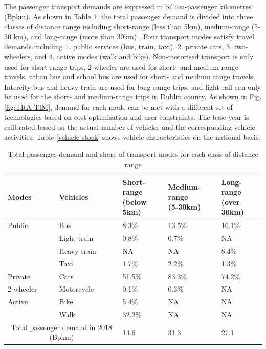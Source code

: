 \documentclass[gmd,manuscript]{copernicus}
\begin{document}
The passenger transport demands are expressed in billion-passenger kilometres (Bpkm). As shown in Table \ref{passenger transport demand}, the total passenger demand is divided into three classes of distance range including short-range (less than 5km), medium-range (5-30 km), and long-range (more than 30km) \citep{NTA2018}. Four transport modes satisfy travel demands including 1. public services (bus, train, taxi), 2. private cars, 3. two-wheelers, and 4. active modes (walk and bike). Non-motorised transport is only used for short-range trips, 2-wheeler are used for short- and medium-range travels, urban bus and school bus are used for short- and medium range travels, Intercity bus and heavy train are used for long-range trips, and light rail can only be used for the short- and medium-range trips in Dublin county. As shown in Fig. \ref{fig:TRA-TIM}, demand for each mode can be met with a different set of technologies based on cost-optimisation and user constraints. The base year is calibrated based on the actual number of vehicles and the corresponding vehicle activities. Table \ref{vehicle stock} shows vehicle characteristics on the national basis. 

\begin{table}[h!]
 \centering
 \footnotesize
 \caption{Total passenger demand and share of transport modes for each class of distance range \citep{CentralStatisticsOffice2017, CSONTS19how, CentralStatisticsOffice2020a, CentralStatisticsOffice2020c, CentralStatisticsOffice2020d, CentralStatisticsOffice2020e}}
 \begin{tabular}{lllll}
 \hline 
 Modes & Vehicles & \makecell{Short-range \\ (below 5km)} & \makecell{Medium-range \\ (5-30km)} & \makecell{Long-range \\ (over 30km)} \\ 
 \hline
 Public & Bus & 8.3\% &	13.5\% &	16.1\% \\
 & Light train &	0.8\% &	0.7\% &	NA \\
 & Heavy train &	NA & NA &	8.4\% \\
 & Taxi &	1.7\% &	2.2\% &	1.3\% \\
 \hline
 Private & Cars	& 51.5\% &	83.3\%	& 74.2\% \\
 \hline
 2-wheeler & Motorcycle & 0.1\% &	0.3\%	& NA \\
 \hline
 Active & Bike &	5.4\% & 	NA & 	NA \\
 
 & Walk &	32.2\% &	NA &	NA \\
 \hline
 \multicolumn{2}{c}{Total passenger demand in 2018 (Bpkm)} &	14.6 &	31.3 &	27.1 \\ [1ex]
 \hline
 \end{tabular}
 
 \label{passenger transport demand}
\end{table}
\end{document}
